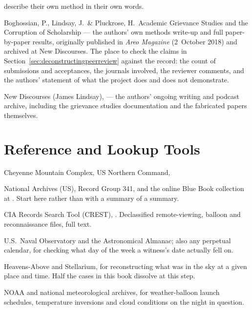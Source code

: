 \begin{list}{}{\setlength{\leftmargin}{1.2em}\setlength{\itemindent}{-1.2em}
\setlength{\itemsep}{3pt}}
describe their own method in their own words.
\item Boghossian, P., Lindsay, J.\ \& Pluckrose, H.\ Academic Grievance Studies and the Corruption
of Scholarship --- the authors' own methods write-up and full paper-by-paper results, originally
published in \emph{Areo Magazine} (2~October 2018) and archived at New Discourses. The place to
check the claims in Section~\ref{sec:deconstructingpeerreview} against the record: the count of
submissions and acceptances, the journals involved, the reviewer comments, and the authors'
statement of what the project does and does not demonstrate.
\item New Discourses (James Lindsay),  --- the authors' ongoing
writing and podcast archive, including the grievance studies documentation and the fabricated papers
themselves.
\end{list}

\section*{Reference and Lookup Tools}

\begin{list}{}{\setlength{\leftmargin}{1.2em}\setlength{\itemindent}{-1.2em}
\setlength{\itemsep}{3pt}}
\item Cheyenne Mountain Complex, US Northern Command, 
\item National Archives (US), Record Group 341, and the online Blue Book collection at
. Start here rather than with a summary of a summary.
\item CIA Records Search Tool (CREST), . Declassified
remote-viewing, balloon and reconnaissance files, full text.
\item U.S.\ Naval Observatory and the Astronomical Almanac; also any perpetual calendar, for
checking what day of the week a witness's date actually fell on.
\item Heavens-Above and Stellarium, for reconstructing what was in the sky at a given place and
time. Half the cases in this book dissolve at this step.
\item NOAA and national meteorological archives, for weather-balloon launch schedules, temperature
inversions and cloud conditions on the night in question.
\end{list}

